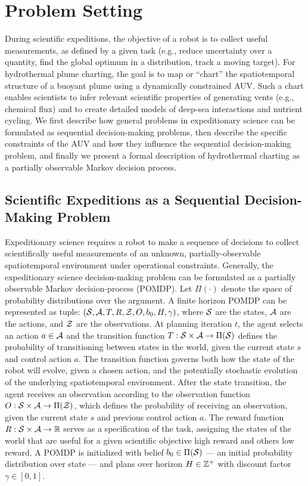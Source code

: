 \chapter{Problem Setting}
\label{chap:problem}
During scientific expeditions, the objective of a robot is to collect useful measurements, as defined by a given task (e.g., reduce uncertainty over a quantity, find the global optimum in a distribution, track a moving target). For hydrothermal plume charting, the goal is to map or ``chart'' the spatiotemporal structure of a buoyant plume using a dynamically constrained AUV. Such a chart enables scientists to infer relevant scientific properties of generating vents (e.g., chemical flux) and to create detailed models of deep-sea interactions and nutrient cycling. We first describe how general problems in expeditionary science can be formulated as sequential decision-making problems, then describe the specific constraints of the AUV \Sentry and how they influence the sequential decision-making problem, and finally we present a formal description of hydrothermal charting as a partially observable Markov decision process. 

\section{Scientific Expeditions as a Sequential Decision-Making Problem}
Expeditionary science requires a robot to make a sequence of decisions to collect scientifically useful measurements of an unknown, partially-observable spatiotemporal environment under operational constraints. Generally, the expeditionary science decision-making problem can be formulated as a partially observable Markov decision-process (POMDP). Let $\Pi(\cdot)$ denote the space of probability distributions over the argument. A finite horizon POMDP can be represented as tuple: $(\mathcal{S}, \mathcal{A}, T, R, \mathcal{Z}, O, b_0, H, \gamma)$, where $\mathcal{S}$ are the states, $\mathcal{A}$ are the actions, and $\mathcal{Z}$ are the observations. At planning iteration $t$, the agent selects an action $a \in \mathcal{A}$ and the transition function $T: \mathcal{S} \times \mathcal{A} \to \Pi(\mathcal{S})$ defines the probability of transitioning between states in the world, given the current state $s$ and control action $a$. The transition function governs both how the state of the robot will evolve, given a chosen action, and the potentially stochastic evolution of the underlying spatiotemporal environment. After the state transition, the agent receives an observation according to the observation function $O: \mathcal{S} \times \mathcal{A} \to \Pi(\mathcal{Z})$, which defines the probability of receiving an observation, given the current state $s$ and previous control action $a$. The reward function $R: \mathcal{S} \times \mathcal{A} \to \mathbb{R}$ serves as a specification of the task, assigning the states of the world that are useful for a given scientific objective high reward and others low reward. A POMDP is initialized with belief $b_0 \in \Pi(\mathcal{S})$ --- an initial probability distribution over state --- and plans over horizon $H \in \mathbb{Z}^+$ with discount factor $\gamma \in [0, 1]$.

